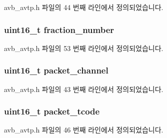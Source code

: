 avb\+\_\+avtp.\+h 파일의 44 번째 라인에서 정의되었습니다.

\subsubsection[{\texorpdfstring{fraction\+\_\+number}{fraction_number}}]{\setlength{\rightskip}{0pt plus 5cm}uint16\+\_\+t fraction\+\_\+number}\hypertarget{structsix1883__header_a1a119b57c43180e27c35bc0394930879}{}\label{structsix1883__header_a1a119b57c43180e27c35bc0394930879}


avb\+\_\+avtp.\+h 파일의 53 번째 라인에서 정의되었습니다.

\subsubsection[{\texorpdfstring{packet\+\_\+channel}{packet_channel}}]{\setlength{\rightskip}{0pt plus 5cm}uint16\+\_\+t packet\+\_\+channel}\hypertarget{structsix1883__header_a3ddfab5f02c3bd28ffb22c1d4478ba67}{}\label{structsix1883__header_a3ddfab5f02c3bd28ffb22c1d4478ba67}


avb\+\_\+avtp.\+h 파일의 43 번째 라인에서 정의되었습니다.

\subsubsection[{\texorpdfstring{packet\+\_\+tcode}{packet_tcode}}]{\setlength{\rightskip}{0pt plus 5cm}uint16\+\_\+t packet\+\_\+tcode}\hypertarget{structsix1883__header_ac86ef7cc33218945d4c73609a2fc58fb}{}\label{structsix1883__header_ac86ef7cc33218945d4c73609a2fc58fb}


avb\+\_\+avtp.\+h 파일의 46 번째 라인에서 정의되었습니다.

